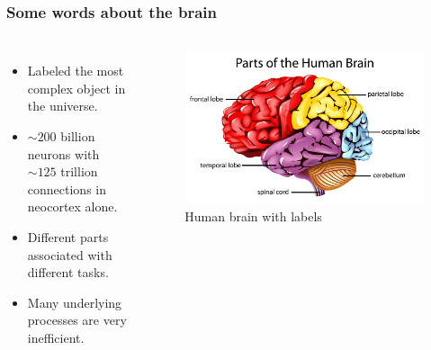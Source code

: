 \begin{frame}
 \frametitle{Some words about the brain}
 \begin{columns}
 \begin{itemize}
  \item Labeled the most complex object in the universe.
  \item $\sim200$ billion neurons with $\sim125$ trillion connections in neocortex alone.
  \item Different parts associated with different tasks.
  \item Many underlying processes are very inefficient.
 \end{itemize}
  \begin{figure}[H]
  \centering
  \includegraphics[scale=0.27]{figures/human_brain.jpg}
  \caption{Human brain with labels}
  \end{figure}
 \end{columns} 
\end{frame}



